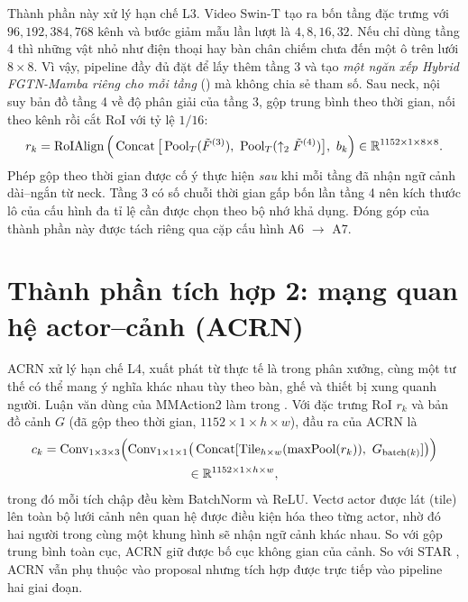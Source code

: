 Thành phần này xử lý hạn chế L3. Video Swin-T tạo ra bốn tầng đặc trưng với $96, 192, 384, 768$ kênh và bước giảm mẫu lần lượt là $4, 8, 16, 32$. Nếu chỉ dùng tầng 4 thì những vật nhỏ như điện thoại hay bàn chân chiếm chưa đến một ô trên lưới $8 \times 8$. Vì vậy, pipeline đầy đủ đặt  để lấy thêm tầng 3 và tạo \emph{một ngăn xếp Hybrid FGTN-Mamba riêng cho mỗi tầng} () mà không chia sẻ tham số. Sau neck,  nội suy bản đồ tầng 4 về độ phân giải của tầng 3, gộp trung bình theo thời gian, nối theo kênh rồi cắt RoI với tỷ lệ $1/16$:
\begin{equation}
r_k = \operatorname{RoIAlign}\Big(\operatorname{Concat}\big[\operatorname{Pool}_T(\tilde{F}^{(3)}),\ \operatorname{Pool}_T(\uparrow_2 \tilde{F}^{(4)})\big],\ b_k\Big) \in \mathbb{R}^{1152 \times 1 \times 8 \times 8}.
\label{eq:multiscale}
\end{equation}
Phép gộp theo thời gian được cố ý thực hiện \emph{sau} khi mỗi tầng đã nhận ngữ cảnh dài--ngắn từ neck. Tầng 3 có số chuỗi thời gian gấp bốn lần tầng 4 nên kích thước lô của cấu hình đa tỉ lệ cần được chọn theo bộ nhớ khả dụng. Đóng góp của thành phần này được tách riêng qua cặp cấu hình A6 $\rightarrow$ A7.

\section{Thành phần tích hợp 2: mạng quan hệ actor--cảnh (ACRN)}
\label{sec:acrn}

ACRN \cite{sun2018acrn} xử lý hạn chế L4, xuất phát từ thực tế là trong phân xưởng, cùng một tư thế có thể mang ý nghĩa khác nhau tùy theo bàn, ghế và thiết bị xung quanh người. Luận văn dùng  của MMAction2 làm  trong . Với đặc trưng RoI $r_k$ và bản đồ cảnh $G$ (đã gộp theo thời gian, $1152 \times 1 \times h \times w$), đầu ra của ACRN là
\begin{multline}
c_k = \mathrm{Conv}_{1\times3\times3}\Big(\mathrm{Conv}_{1\times1\times1}\big(\operatorname{Concat}[\operatorname{Tile}_{h \times w}(\max\!\operatorname{Pool}(r_k)),\ G_{\text{batch}(k)}]\big)\Big)\\
\in \mathbb{R}^{1152 \times 1 \times h \times w},
\label{eq:acrn}
\end{multline}
trong đó mỗi tích chập đều kèm BatchNorm và ReLU. Vectơ actor được lát (tile) lên toàn bộ lưới cảnh nên quan hệ được điều kiện hóa theo từng actor, nhờ đó hai người trong cùng một khung hình sẽ nhận ngữ cảnh khác nhau. So với gộp trung bình toàn cục, ACRN giữ được bố cục không gian của cảnh. So với STAR \cite{gritsenko2024star}, ACRN vẫn phụ thuộc vào proposal nhưng tích hợp được trực tiếp vào pipeline hai giai đoạn.

